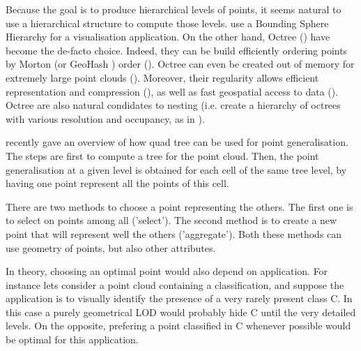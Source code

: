 	
	Because the goal is to produce hierarchical levels of points, it seems natural to use a hierarchical structure to compute those levels.
	\cite{Rusinkiewicz2000} use a Bounding Sphere Hierarchy for a visualisation application.
	On the other hand, Octree (\cite{Meagher1982}) have become the de-facto choice.
	Indeed, they can be build efficiently ordering points by Morton (or GeoHash \cite{Sabo2014}) order (\cite{Feng2014}).
	Octree can even be created out of memory for extremely large point clouds (\cite{Baert2014}). 
	Moreover, their regularity allows efficient representation and compression (\cite{Schnabel2006,Huang2006}), as well as fast geospatial access to data (\cite{Elseberg2013}).
	Octree are also natural condidates to nesting (i.e. create a hierarchy of octrees with various resolution and occupancy, as in \cite{Hornung2013}). 
	
	
	\cite{Bereuter2015} recently gave an overview of how quad tree can be used for point generalisation.
	The steps are first to compute a tree for the point cloud.
	Then, the point generalisation at a given level is obtained for each cell of the same tree level, by having one point represent all the points of this cell.
	
	There are two methods to choose a point representing the others. The first one is to select on points among all ('select').
	The second method is to create a new point that will represent well the others ('aggregate'). 
	Both these methods can use geometry of points, but also other attributes.
	
	In theory, choosing an optimal point would also depend on application.
	For instance lets consider a point cloud containing a classification, and suppose the application is to visually identify the presence of a very rarely present class C.
	In this case a purely geometrical LOD would probably hide C until the very detailed levels. On the opposite, prefering a point classified in C whenever possible would be optimal for this application.
	
